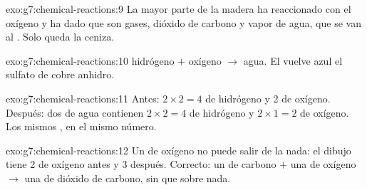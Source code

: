 \begin{solution}{exo:g7:chemical-reactions:9}
La mayor parte de la madera ha reaccionado con el oxígeno y ha dado
 que son gases, dióxido de carbono y vapor de agua, que se van
al . Solo queda la ceniza.
\end{solution}

\begin{solution}{exo:g7:chemical-reactions:10}
hidrógeno $+$ oxígeno $\longrightarrow$ agua. El  vuelve azul el
sulfato de cobre anhidro.
\end{solution}

\begin{solution}{exo:g7:chemical-reactions:11}
Antes: $2 \times 2 = 4$  de hidrógeno y 2  de oxígeno.
Después: dos  de agua contienen $2 \times 2 = 4$  de
hidrógeno y $2 \times 1 =
2$  de oxígeno. Los mismos , en el mismo número.
\end{solution}

\begin{solution}{exo:g7:chemical-reactions:12}
Un  de oxígeno no puede salir de la nada: el dibujo tiene 2 
de oxígeno antes y 3 después. Correcto: un  de carbono $+$ una
 de oxígeno
$\longrightarrow$ una  de dióxido de carbono, sin que sobre
nada.
\end{solution}

